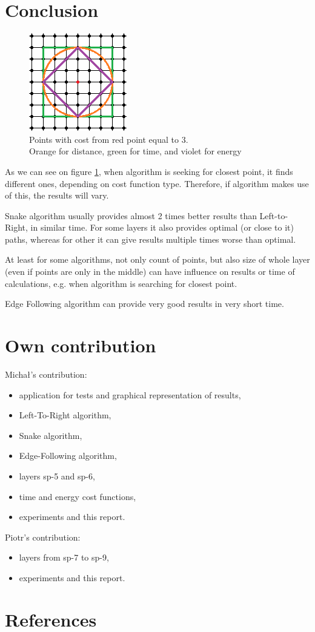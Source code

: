 \documentclass[titlepage]{article}
\begin{document}
\section{Conclusion}
\begin{figure}
\begin{center}
\includegraphics[scale=2]{img/costs}
\end{center}
\caption{Points with cost from red point equal to 3.\\Orange for distance, green for time, and violet for energy}
\label{cost_function_representation}
\end{figure}
As we can see on figure \ref{cost_function_representation}, when algorithm is seeking for closest point, it finds different ones, depending on cost function type. Therefore, if algorithm makes use of this, the results will vary.

Snake algorithm usually provides almost 2 times better results than Left-to-Right, in similar time. For some layers it also provides optimal (or close to it) paths, whereas for other it can give results multiple times worse than optimal.

At least for some algorithms, not only count of points, but also size of whole layer (even if points are only in the middle) can have influence on results or time of calculations, e.g. when algorithm is searching for closest point.

Edge Following algorithm can provide very good results in very short time.

\section{Own contribution}
Michał's contribution:
\begin{itemize}
\item application for tests and graphical representation of results,
\item Left-To-Right algorithm,
\item Snake algorithm,
\item Edge-Following algorithm,
\item layers sp-5 and sp-6,
\item time and energy cost functions,
\item experiments and this report.
\end{itemize}
Piotr's contribution:
\begin{itemize}
\item layers from sp-7 to sp-9,
\item experiments and this report. 
\end{itemize}

\section{References}
\end{document}
